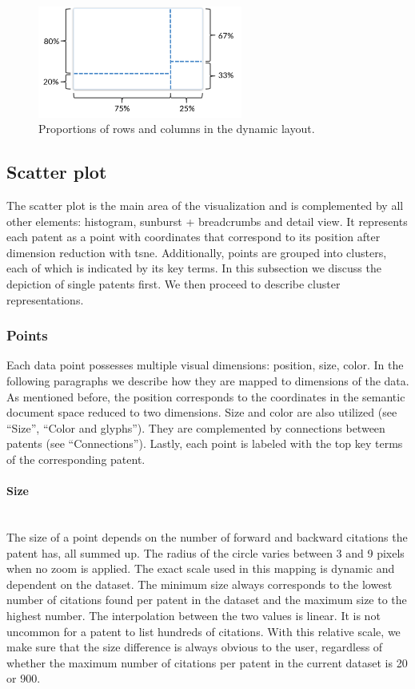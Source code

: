\begin{figure}[!]
\centering
\includegraphics[width=0.6\textwidth]{img/columns_rows_layout}
\caption{Proportions of rows and columns in the dynamic layout.}
\label{fig:columns_rows_layout}
\end{figure}

\subsection{Scatter plot}
\label{subsec:scatter_plot}

The scatter plot is the main area of the visualization and is complemented by all other elements: histogram, sunburst + breadcrumbs and detail view.
It represents each patent as a point with coordinates that correspond to its position after dimension reduction with \gls{tsne}.
Additionally, points are grouped into clusters, each of which is indicated by its key terms.
In this subsection we discuss the depiction of single patents first. 
We then proceed to describe cluster representations.

\subsubsection{Points}
\label{subsubsec:points}
Each data point possesses multiple visual dimensions: position, size, color. 
In the following paragraphs we describe how they are mapped to dimensions of the data.
As mentioned before, the position corresponds to the coordinates in the semantic document space reduced to two dimensions.
Size and color are also utilized (see ``Size'', ``Color and glyphs'').
They are complemented by connections between patents (see ``Connections'').
Lastly, each point is labeled with the top key terms of the corresponding patent.

\paragraph{Size}~\\
The size of a point depends on the number of forward and backward citations the patent has, all summed up.
The radius of the circle varies between 3 and 9 pixels when no zoom is applied.
The exact scale used in this mapping is dynamic and dependent on the dataset. 
The minimum size always corresponds to the lowest number of citations found per patent in the dataset and the maximum size to the highest number.
The interpolation between the two values is linear.
It is not uncommon for a patent to list hundreds of citations.
With this relative scale, we make sure that the size difference is always obvious to the user, regardless of whether the maximum number of citations per patent in the current dataset is 20 or 900.

